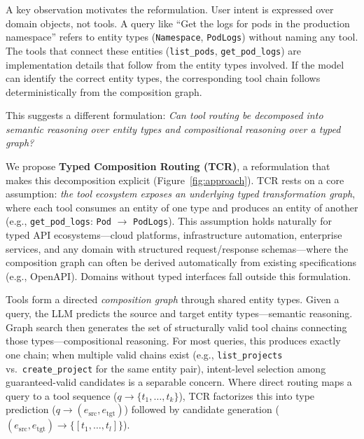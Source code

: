 A key observation motivates the reformulation.
User intent is expressed over domain objects, not tools.
A query like ``Get the logs for pods in the production namespace'' refers to entity types (\texttt{Namespace}, \texttt{PodLogs}) without naming any tool.
The tools that connect these entities (\texttt{list\_pods}, \texttt{get\_pod\_logs}) are implementation details that follow from the entity types involved.
If the model can identify the correct entity types, the corresponding tool chain follows deterministically from the composition graph.

This suggests a different formulation: \emph{Can tool routing be decomposed into semantic reasoning over entity types and compositional reasoning over a typed graph?}

We propose \textbf{Typed Composition Routing (TCR)}, a reformulation that makes this decomposition explicit (Figure~\ref{fig:approach}).
TCR rests on a core assumption: \emph{the tool ecosystem exposes an underlying typed transformation graph}, where each tool consumes an entity of one type and produces an entity of another (e.g., \texttt{get\_pod\_logs}: \texttt{Pod} $\rightarrow$ \texttt{PodLogs}).
This assumption holds naturally for typed API ecosystems---cloud platforms, infrastructure automation, enterprise services, and any domain with structured request/response schemas---where the composition graph can often be derived automatically from existing specifications (e.g., OpenAPI).
Domains without typed interfaces fall outside this formulation.

Tools form a directed \emph{composition graph} through shared entity types.
Given a query, the LLM predicts the source and target entity types---semantic reasoning.
Graph search then generates the set of structurally valid tool chains connecting those types---compositional reasoning.
For most queries, this produces exactly one chain; when multiple valid chains exist (e.g., \texttt{list\_projects} vs.\ \texttt{create\_project} for the same entity pair), intent-level selection among guaranteed-valid candidates is a separable concern.
Where direct routing maps a query to a tool sequence ($q \rightarrow \{t_1, \ldots, t_k\}$), TCR factorizes this into type prediction ($q \rightarrow (e_{\mathrm{src}}, e_{\mathrm{tgt}})$) followed by candidate generation ($(e_{\mathrm{src}}, e_{\mathrm{tgt}}) \rightarrow \{[t_1, \ldots, t_l]\}$).

